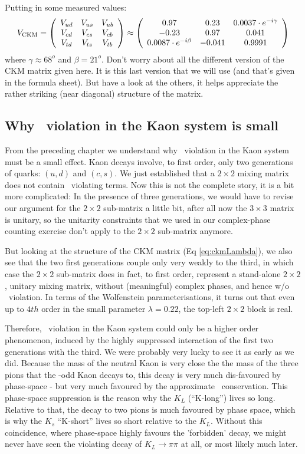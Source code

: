  Putting in some measured values:
 \begin{equation}
\label{eq:th.b.ckmlabel_1}
  V_{\mathrm{CKM}}= \left( \begin{array}{ccc}  V_{ud}  &  V_{us}  &  V_{ub}  \\ 
                        V_{cd}  &  V_{cs}  &  V_{cb}  \\ 
                        V_{td}  &  V_{ts}  &  V_{tb}  \end{array} \right)
\approx
                  \left( \begin{array}{ccc}  0.97  &  0.23  &  0.0037\cdot e^{-i \gamma}  \\ 
                        -0.23  &  0.97 & 0.041  \\ 
                        0.0087\cdot e^{-i \beta}  & -0.041  & 0.9991  \end{array} \right)
\end{equation}
where $\gamma \approx 68^o$ and $\beta = 21^o$. Don't worry about all the different version of the CKM matrix given here. It is this last version that we will use (and that's given in the formula sheet). But have a look at the others, it helps appreciate the rather striking (near diagonal) structure of the matrix.

 
\subsection{Why \cp\ violation in the Kaon system is small}
 
 From the preceding chapter we understand why \cp\ violation in the
 Kaon system must be a small effect. Kaon decays involve, to first
 order, only two generations of quarks: $(u,d)$ and $(c,s)$. We just
 established that a $2\times 2$ mixing matrix does not contain \cp\
 violating terms. Now this is not the complete story, it is a bit more
 complicated: In the presence of three generations, we would have
 to revise our argument for the $2\times 2$ sub-matrix a little bit,
 after all now the $3\times 3$ matrix is unitary, so the unitarity
 constraints that we used in our complex-phase counting exercise
 don't apply to the $2\times 2$ sub-matrix anymore.

 But looking at the structure of the CKM matrix (Eq
 \ref{eq:ckmLambda}), we also see that the two first generations
 couple only very weakly to the third, in which case the $2\times 2$
 sub-matrix does in fact, to first order, represent a stand-alone
 $2\times 2$, unitary mixing matrix, without (meaningful) complex
 phases, and hence w/o \cp\ violation. In terms of the Wolfenstein
 parameterisations, it turns out that even up to $4th$ order in the
 small parameter $\lambda=0.22$, the top-left $2\times 2$ block is
 real.

 Therefore, \cp\ violation in the Kaon system could only be a higher
 order phenomenon, induced by the highly suppressed interaction of the
 first two generations with the third. We were probably very lucky to
 see it as early as we did. Because the mass of the neutral Kaon is very close the the
 mass of the three pions that the \cp-odd Kaon decays to, this decay is
 very much dis-favoured by phase-space - but very much favoured by the
 approximate \cp\ conservation. This phase-space suppression is the reason
 why the $K_L$ (``K-long'') lives so long. Relative to that, the decay
 to two pions is much favoured by phase space, which is why the $K_s$
 ``K-short'' lives so short relative to the $K_L$. Without this
 coincidence, where phase-space highly favours the 'forbidden' decay,
 we might never have seen the \cp\-violating decay of $K_L\to \pi\pi$ at
 all, or most likely much later.

